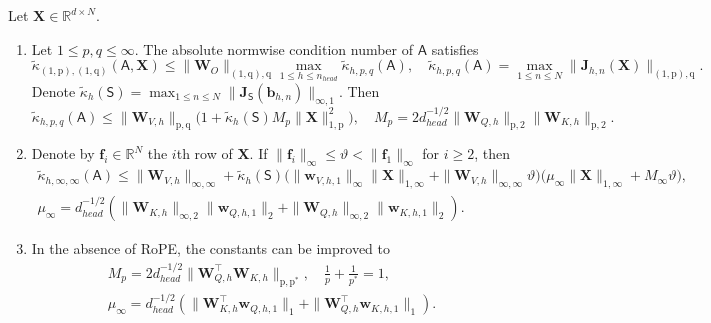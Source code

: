 \documentclass[10pt,a4paper]{amsart}
\newcommand{\Layer}[1]{\mathsf{#1}}
\newcommand{\Matrix}[1]{\mathbf{#1}}
\newcommand{\Norm}[3][]{#1\| #2 #1\|_{\mathrm{#3}}}
\newcommand{\Real}{\mathbb{R}}
\newcommand{\condabs}[3][]{\tilde{\kappa}_{\mathrm{#2}} #1( #3 #1)}
\newcommand{\trans}{\intercal}
\begin{document}
\begin{theorem}
\label{theorem:condabs-attention}
Let $\Matrix{X} \in \Real^{d \times N}$.
\begin{enumerate}
    \item Let $1 \leq p,q \leq \infty$.
    The absolute normwise condition number of $\Layer{A}$ satisfies
    \begin{equation*}
        \condabs{(1,p),(1,q)}{\Layer{A}, \Matrix{X}} \leq \Norm{\Matrix{W}_O}{(1,q),q} \max_{1 \leq h \leq n_{head}} \tilde{\kappa}_{h,p,q}(\Layer{A}), \quad \tilde{\kappa}_{h,p,q}(\Layer{A}) = \max_{1 \leq n \leq N} \Norm{\Matrix{J}_{h,n}(\Matrix{X})}{(1,p),q}.
    \end{equation*}
    Denote $\tilde{\kappa}_{h}(\Layer{S}) = \max_{1 \leq n \leq N} \Norm{\Matrix{J}_{\Layer{S}}(\Matrix{b}_{h,n})}{\infty,1}$.
    Then
    \begin{equation*}
        \tilde{\kappa}_{h,p,q}(\Layer{A}) \leq \Norm{\Matrix{W}_{V,h}}{p,q} \Big( 1 + \tilde{\kappa}_{h}(\Layer{S}) M_{p} \Norm{\Matrix{X}}{1,p}^2 \Big), \quad M_{p} = 2 d_{head}^{-1/2} \Norm{\Matrix{W}_{Q,h}}{p,2} \Norm{\Matrix{W}_{K,h}}{p,2}.
    \end{equation*}
    \item Denote by $\Matrix{f}_i \in \Real^N$ the $i$th row of $\Matrix{X}$.
    If $\Norm{\Matrix{f}_{i}}{\infty} \leq \vartheta < \Norm{\Matrix{f}_1}{\infty}$ for $i \geq 2$, then
    \begin{gather*}
        \tilde{\kappa}_{h,\infty,\infty}(\Layer{A}) \leq \Norm{\Matrix{W}_{V,h}}{\infty,\infty} + \tilde{\kappa}_{h}(\Layer{S}) \Big( \Norm{\Matrix{w}_{V,h,1}}{\infty} \Norm{\Matrix{X}}{1,\infty} + \Norm{\Matrix{W}_{V,h}}{\infty,\infty} \vartheta \Big) \Big( \mu_\infty \Norm{\Matrix{X}}{1,\infty} + M_\infty \vartheta \Big), \\
        \mu_\infty = d_{head}^{-1/2} (\Norm{\Matrix{W}_{K,h}}{\infty,2} \Norm{\Matrix{w}_{Q,h,1}}{2} + \Norm{\Matrix{W}_{Q,h}}{\infty,2} \Norm{\Matrix{w}_{K,h,1}}{2}).
    \end{gather*}
    \item In the absence of RoPE, the constants can be improved to
    \begin{gather*}
        M_{p} = 2 d_{head}^{-1/2} \Norm{\Matrix{W}_{Q,h}^\trans \Matrix{W}_{K,h}}{p,p^*}, \quad \tfrac{1}{p} + \tfrac{1}{p^*} = 1, \\
        \mu_\infty = d_{head}^{-1/2} (\Norm{\Matrix{W}_{K,h}^\trans \Matrix{w}_{Q,h,1}}{1} + \Norm{\Matrix{W}_{Q,h}^\trans \Matrix{w}_{K,h,1}}{1}).
    \end{gather*}
\end{enumerate}
\end{theorem}
\end{document}
